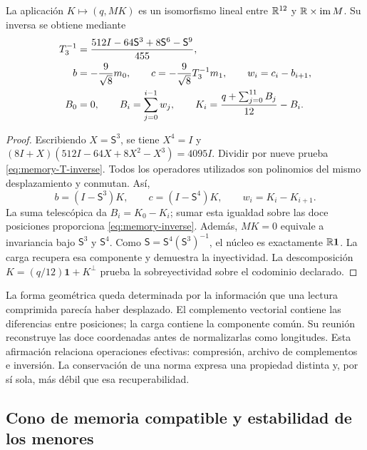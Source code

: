 \begin{theorem}
\label{thm:memory-inversion}
La aplicación \(K\mapsto(q,MK)\) es un isomorfismo lineal entre
\(\mathbb R^{12}\) y \(\mathbb R\times\operatorname{im}M\). Su inversa se obtiene
mediante
\begin{align}
 T_3^{-1}&=\frac{512I-64\mathsf S^3+8\mathsf S^6-\mathsf S^9}{455},
 \label{eq:memory-T-inverse}\\
 b&=-\frac9{\sqrt8}m_0,\qquad
 c=-\frac9{\sqrt8}T_3^{-1}m_1,\qquad w_i=c_i-b_{i+1},\notag\\
 B_0&=0,\qquad B_i=\sum_{j=0}^{i-1}w_j,\qquad
 K_i=\frac{q+\sum_{j=0}^{11}B_j}{12}-B_i.
 \label{eq:memory-inverse}
\end{align}
\end{theorem}
\begin{proof}
Escribiendo \(X=\mathsf S^3\), se tiene \(X^4=I\) y
\((8I+X)(512I-64X+8X^2-X^3)=4095I\). Dividir por nueve
prueba \eqref{eq:memory-T-inverse}. Todos los operadores utilizados son
polinomios del mismo desplazamiento y conmutan. Así,
\[
 b=(I-\mathsf S^3)K,\qquad c=(I-\mathsf S^4)K,
 \qquad w_i=K_i-K_{i+1}.
\]
La suma telescópica da \(B_i=K_0-K_i\); sumar esta igualdad sobre
las doce posiciones proporciona \eqref{eq:memory-inverse}. Además,
\(MK=0\) equivale a invariancia bajo \(\mathsf S^3\) y
\(\mathsf S^4\). Como \(\mathsf S=\mathsf S^4(\mathsf S^3)^{-1}\),
el núcleo es exactamente \(\mathbb R\mathbf1\). La carga recupera esa
componente y demuestra la inyectividad. La descomposición
\(K=(q/12)\mathbf1+K^\perp\) prueba la sobreyectividad sobre el
codominio declarado.
\end{proof}

La forma geométrica queda determinada por la información que una lectura
comprimida parecía haber desplazado. El complemento vectorial contiene las
diferencias entre posiciones; la carga contiene la componente común. Su
reunión reconstruye las doce coordenadas antes de normalizarlas como
longitudes. Esta afirmación relaciona operaciones efectivas: compresión,
archivo de complementos e inversión. La conservación de una norma expresa
una propiedad distinta y, por sí sola, más débil que esa recuperabilidad.

\subsection{Cono de memoria compatible y estabilidad de los menores}

